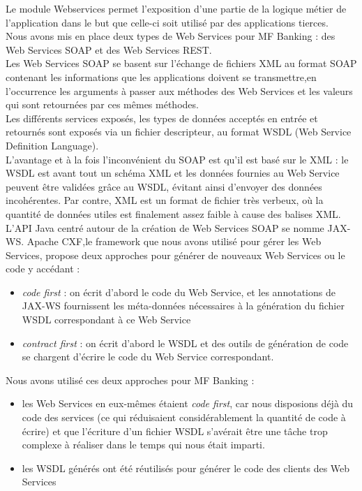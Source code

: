 Le module Webservices permet l'exposition d'une partie de la logique métier de l'application dans le but que celle-ci soit utilisé par des applications tierces.\\  
Nous avons mis en place deux types de Web Services pour MF Banking : des Web Services SOAP et des Web Services REST.\\

Les Web Services SOAP se basent sur l'échange de fichiers XML au format SOAP contenant les informations que les applications doivent se transmettre,en l'occurrence les arguments à passer aux méthodes des Web Services et les valeurs qui sont retournées par ces mêmes méthodes.\\
Les différents services exposés, les types de données acceptés en entrée et retournés sont exposés via un fichier descripteur, au format WSDL (Web Service Definition Language).\\
L'avantage et à la fois l'inconvénient du SOAP est qu'il est basé sur le XML : le WSDL est avant tout un schéma XML et les données fournies au Web Service peuvent être validées grâce au WSDL, évitant ainsi d'envoyer des données incohérentes. Par contre, XML est un format de fichier très verbeux, où la quantité de données \og utiles \fg{} est finalement assez faible à cause des balises XML. \\
L'API Java centré autour de la création de Web Services SOAP se nomme JAX-WS.
Apache CXF,le framework que nous avons utilisé pour gérer les Web Services, propose deux approches pour générer de nouveaux Web Services ou le code y accédant :
 
\begin{itemize}
	\item \textit{code first} : on écrit d'abord le code du Web  Service, et les annotations de JAX-WS fournissent les méta-données nécessaires à la génération du fichier WSDL correspondant à ce Web Service
	\item \textit{contract first} : on écrit d'abord le WSDL et des outils de génération de code se chargent d'écrire le code du Web Service correspondant.\\
\end{itemize}

Nous avons utilisé ces deux approches pour MF Banking :
\begin{itemize}
	\item les Web Services en eux-mêmes étaient \textit{code first}, car nous disposions déjà du code des services (ce qui réduisaient considérablement la quantité de code à écrire) et que l'écriture d'un fichier WSDL s'avérait être une tâche trop complexe à réaliser dans le temps qui nous était imparti.
	\item les WSDL générés ont été réutilisés pour générer le code des clients des Web Services\\
\end{itemize}

